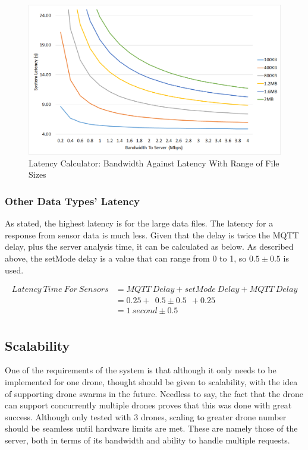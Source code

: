 \documentclass{article}
\begin{document}
\begin{figure}[h]
\caption{Latency Calculator: Bandwidth Against Latency With Range of File Sizes\label{fig:LatencyVsBandwidth}}
\includegraphics[width=\textwidth]{LatencyVsBandwidth}
\end{figure}

\subsubsection{Other Data Types' Latency}
As stated, the highest latency is for the large data files. The latency for a response from sensor data is much less. Given that the delay is twice the MQTT delay, plus the server analysis time, it can be calculated as below. As described above, the setMode delay is a value that can range from 0 to 1, so $0.5\pm0.5$ is used.

\begin{equation*}
\begin{split}
Latency\ Time\ For\ Sensors & = MQTT\ Delay + setMode\ Delay + MQTT\ Delay \\
							& = 0.25 +\ \ 0.5 \pm 0.5 \ \ + 0.25 \\
							& = 1\ second \pm 0.5 \\
\end{split}
\end{equation*}

\subsection{Scalability}
One of the requirements of the system is that although it only needs to be implemented for one drone, thought should be given to scalability, with the idea of supporting drone swarms in the future. Needless to say, the fact that the drone can support concurrently multiple drones proves that this was done with great success. Although only tested with 3 drones, scaling to greater drone number should be seamless until hardware limits are met. These are namely those of the server, both in terms of its bandwidth and ability to handle multiple requests. 
\end{document}
